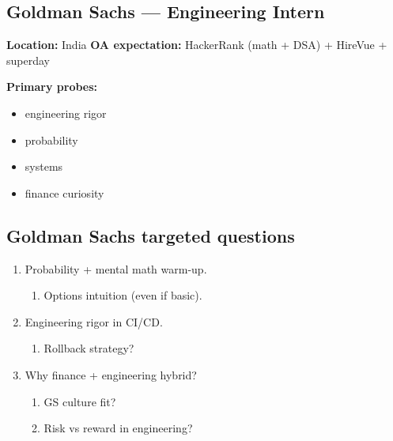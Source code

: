 \documentclass[9pt,a4paper]{article}
\begin{document}
\subsection{Goldman Sachs --- Engineering Intern}
\textbf{Location:} India \quad \textbf{OA expectation:} HackerRank (math + DSA) + HireVue + superday

\textbf{Primary probes:}
\begin{itemize}
  \item engineering rigor
  \item probability
  \item systems
  \item finance curiosity
\end{itemize}

\subsection{Goldman Sachs targeted questions}
\begin{enumerate}[label=\textbf{Q\arabic*:}, leftmargin=*]
  \item Probability + mental math warm-up.
  \begin{enumerate}[label=\textit{FU\arabic*:}, leftmargin=2em]
    \item Options intuition (even if basic).
  \end{enumerate}
  \item Engineering rigor in CI/CD.
  \begin{enumerate}[label=\textit{FU\arabic*:}, leftmargin=2em]
    \item Rollback strategy?
  \end{enumerate}
  \item Why finance + engineering hybrid?
  \begin{enumerate}[label=\textit{FU\arabic*:}, leftmargin=2em]
    \item GS culture fit?
    \item Risk vs reward in engineering?
  \end{enumerate}
\end{enumerate}
\end{document}

